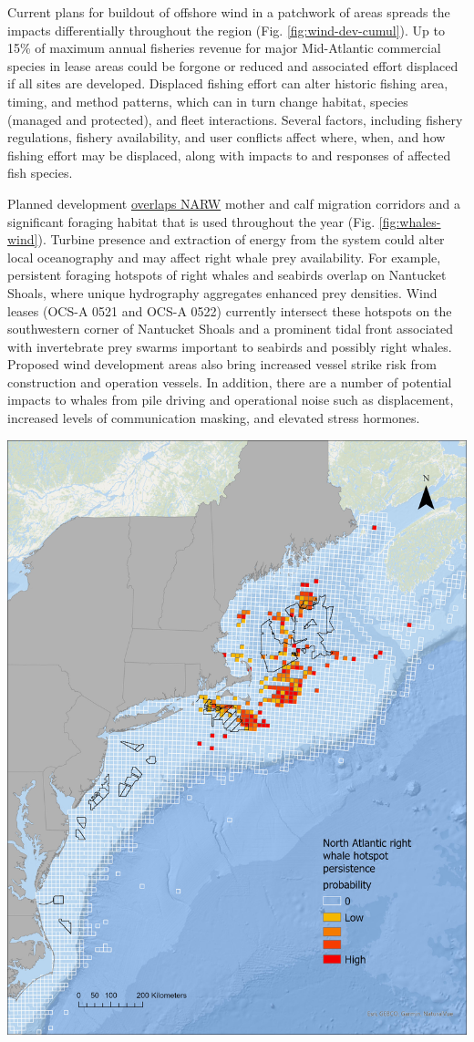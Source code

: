 \documentclass[
  10pt,
]{article}
\let\origfigure\figure
\let\endorigfigure\endfigure
\renewenvironment{figure}[1][2] {
    \expandafter\origfigure\expandafter[H]
} {
    \endorigfigure
}
\begin{document}
Current plans for buildout of offshore wind in a patchwork of areas spreads the impacts differentially throughout the region (Fig. \ref{fig:wind-dev-cumul}). Up to 15\% of maximum annual fisheries revenue for major Mid-Atlantic commercial species in lease areas could be forgone or reduced and associated effort displaced if all sites are developed. Displaced fishing effort can alter historic fishing area, timing, and method patterns, which can in turn change habitat, species (managed and protected), and fleet interactions. Several factors, including fishery regulations, fishery availability, and user conflicts affect where, when, and how fishing effort may be displaced, along with impacts to and responses of affected fish species.

Planned development \href{https://noaa-edab.github.io/catalog/persistent_hotspots.html}{overlaps NARW} mother and calf migration corridors and a significant foraging habitat that is used throughout the year (Fig. \ref{fig:whales-wind}). Turbine presence and extraction of energy from the system could alter local oceanography and may affect right whale prey availability. For example, persistent foraging hotspots of right whales and seabirds overlap on Nantucket Shoals, where unique hydrography aggregates enhanced prey densities. Wind leases (OCS-A 0521 and OCS-A 0522) currently intersect these hotspots on the southwestern corner of Nantucket Shoals and a prominent tidal front associated with invertebrate prey swarms important to seabirds and possibly right whales. Proposed wind development areas also bring increased vessel strike risk from construction and operation vessels. In addition, there are a number of potential impacts to whales from pile driving and operational noise such as displacement, increased levels of communication masking, and elevated stress hormones.

\begin{figure}

{\centering \includegraphics[width=0.55\linewidth]{images/BothReports/NARW_hotspots_final_2024} 

}

\caption{Northern Right Whale persistent hotspots (red shading) and Wind Energy Areas (black outlines).}\label{fig:whales-wind}
\end{figure}
\end{document}
